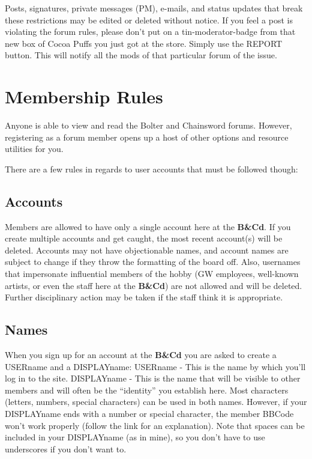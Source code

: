 \documentclass[12pt]{article}
\newcommand{\BnC}{{\textbf{B\&Cd}}}%
\begin{document}
Posts, signatures, private messages (PM), e-mails, and status updates 
that break these restrictions may be edited or deleted without notice. 
If you feel a post is violating the forum rules, please don't put on a 
tin-moderator-badge from that new box of Cocoa Puffs you just got at 
the store. Simply use the REPORT button. This will notify all the mods 
of that particular forum of the issue.


\section{Membership Rules}


Anyone is able to view and read the Bolter and Chainsword forums. 
However, registering as a forum member opens up a host of other options 
and resource utilities for you.

There are a few rules in regards to user accounts that must be followed 
though:

\subsection{Accounts}


Members are allowed to have only a single account here at the 
{\BnC}. If you create multiple accounts and get caught, the most 
recent account(s) will be deleted. Accounts may not have objectionable 
names, and account names are subject to change if they throw the 
formatting of the board off. Also, usernames that impersonate 
influential members of the hobby (GW employees, well-known artists, or 
even the staff here at the {\BnC}) are not allowed and 
will be deleted. Further disciplinary action may be taken if the staff 
think it is appropriate.

\subsection{Names}

When you sign up for an account at the {\BnC} you are asked to create a 
USERname and a DISPLAYname:
USERname - This is the name by which you'll log in to the site.
DISPLAYname - This is the name that will be visible to other members 
and will often be the ``identity'' you establish here.
Most characters (letters, numbers, special characters) can be used in 
both names. However, if your DISPLAYname ends with a number or special 
character, the member BBCode won't work properly (follow the link for 
an explanation). Note that spaces can be included in your DISPLAYname 
(as in mine), so you don't have to use underscores if you don't want to.
\end{document}

